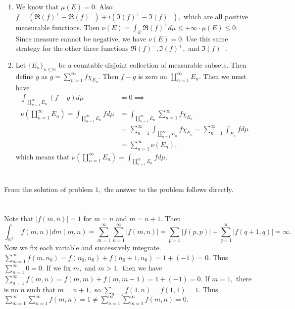 \documentclass{article}
\begin{document}
\section{} %

\section{} %

\section{} %
\begin{enumerate}
	\item We know that $\mu(E)=0.$ Also $f= (\Re (f)^+ - \Re (f)^-)+i(\Im (f)^+ - \Im (f)^-),$ which are all positive measurable functions. Then $\nu(E)=\int_E \Re (f)^+ d\mu \leq +\infty \cdot \mu(E) \leq 0.$ Since measure cannot be negative, we have $\nu(E)=0.$ Use this same strategy for the other three functions $\Re (f)^-,\Im (f)^+,$ and $ \Im (f)^-.$
	\item Let $\{E_n\}_{n \in \mathbb{N}}$ be a countable disjoint collection of measurable subsets. Then define $g$ as $g= \sum_{n=1}^{\infty}f\chi_{E_n}.$ Then $f-g$ is zero on $\coprod_{n=1}^{\infty} E_n.$ Then we must have  
	\begin{align*}
		\int_{\coprod_{n=1}^{\infty}E_n}(f-g) d\mu&=0 \implies \\ \nu(\coprod_{n=1}^{\infty}E_n) =\int_{\coprod_{n=1}^{\infty}E_n}f d\mu &= \int_{\coprod_{n=1}^{\infty}E_n} \sum_{n=1}^{\infty} f\chi_{E_n}\\
		&=\sum_{n=1}^{\infty} \int_{\coprod_{n=1}^{\infty}E_n} f\chi_{E_n}=\sum_{n=1}^{\infty} \int_{E_n}f d\mu\\
		&= \sum_{n=1}^{\infty} \nu(E_n),
	\end{align*} which means that $\nu(\coprod_{n=1}^{\infty}E_n)=\int_{\coprod_{n=1}^{\infty}E_n}f d\mu.$
\end{enumerate}

\section{} %
From the solution of problem $1,$ the answer to the problem follows directly.

\section{} %
Note that $|f(m,n)|=1$ for $m=n$ and $m=n+1.$ Then $$\int_{\mathbb{N}^2} |f(m,n)| dm(m,n)= \sum_{m=1}^{\infty} \sum_{n=1}^{\infty} |f(m,n)| = \sum_{p=1} |f(p,p)| + \sum_{q=1}^{\infty}|f(q+1,q)|=\infty.$$
Now we fix each variable and successively integrate. $\sum_{m=1}^{\infty} f(m,n_0)= f(n_0,n_0)+f(n_0+1,n_0)=1+ (-1)=0.$ Thus $\sum_{n=1}^{\infty}0=0.$ If we fix $m,$ and $m>1,$ then we have $\sum_{n=1}^{\infty} f(m,n)= f(m,m)+f(m,m-1)=1+(-1)=0.$ If $m=1,$ there is no $n$ such that $ m=n+1,$ so $\sum_{n=1}f(1,n)=f(1,1)=1.$ Thus $ \sum_{m=1}^{\infty} \sum_{n=1}^{\infty} f(m,n) = 1 \neq \sum_{n=1}^{\infty} \sum_{m=1}^{\infty} f(m,n) = 0.$
\end{document}
